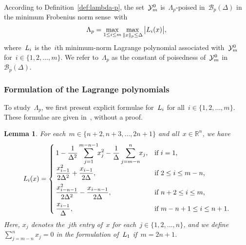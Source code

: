 \documentclass[draft]{article}
\numberwithin{equation}{section}
\theoremstyle{definition}
\theoremstyle{plain}
\newtheorem{lemma}{Lemma}[section]
\theoremstyle{remark}
\newcommand*{\abs}[2][]{#1\lvert#2#1\rvert}
\newcommand*{\lagp}[1][]{L\ifblank{#1}{}{_{#1}}}
\newcommand*{\norm}[2][]{#1\lVert#2#1\rVert}
\newcommand*{\R}{\mathbb{R}}
\newcommand*{\set}[2][]{#1\{#2#1\}}
\newcommand*{\xpt}[1][]{\mathcal{Y}\ifblank{#1}{}{^{#1}}}
\begin{document}
According to Definition~\ref{def:lambda-p}, the set~$\xpt[0]_m$ is~$\Lambda_p$-poised in~$\mathcal{B}_p(\Delta)$ in the minimum Frobenius norm sense~with
\begin{equation}
    \label{eq:Lambdap}
    \Lambda_p = \max_{1 \le i \le m} \max_{\norm{x}_p \le \Delta} \abs[\big]{\lagp[i](x)},
\end{equation}
where~$\lagp[i]$ is the~$i$th minimum-norm Lagrange polynomial associated with~$\xpt[0]_m$ for~$i \in \set{1, 2, \dots, m}$.
We refer to~$\Lambda_p$ as the constant of poisedness of~$\xpt[0]_m$ in~$\mathcal{B}_p(\Delta)$.

\subsubsection{Formulation of the Lagrange polynomials}

To study~$\Lambda_p$, we first present explicit formulae for~$\lagp[i]$ for all~$i \in \set{1, 2, \dots, m}$.
These formulae are given in~\cite[\S~3]{Powell_2006}, without a proof.

\begin{lemma}
    \label{lem:lagp}
    For each~$m \in \set{n + 2, n + 3, \dots,  2n + 1}$ and all~$x \in \R^n$, we have
    \begin{equation*}
        \lagp[i](x) =
        \begin{cases}
            \displaystyle 1 - \frac{1}{\Delta^2} \sum_{j = 1}^{m - n - 1} \!\! x_j^2 - \frac{1}{\Delta} \sum_{j = m - n}^n \!\! x_j,    & \text{if~$i = 1$,}\\[2ex]
            \displaystyle \frac{x_{i - 1}^2}{2\Delta^2} + \frac{x_{i - 1}}{2\Delta},                                                    & \text{if~$2 \le i \le m - n$,}\\[2ex]
            \displaystyle \frac{x_{i -n - 1}^2}{2\Delta^2} - \frac{x_{i -n- 1}}{2\Delta},                                               & \text{if~$n+2\le i \le m$,}\\[2ex]
            \displaystyle \frac{x_{i - 1}}{\Delta},                                                                                     & \text{if~$m - n + 1 \le i \le n + 1$.}
        \end{cases}
    \end{equation*}
    Here, $x_j$ denotes the~$j$th entry of~$x$ for each~$j\in\{1,2, \dots, n\}$, and we define~$\sum_{j = m - n}^n x_j = 0$ in the
    formulation of~$\lagp[1]$ if~$m = 2n+1$.
\end{lemma}
\end{document}
